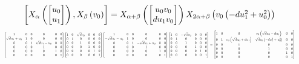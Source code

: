 \documentclass[11pt]{article}
\theoremstyle{definition}
\begin{document}
\[
\scaletoalign{\textwidth}{\left[ X_{\alpha}\left(\left[\begin{matrix}u_{0}\\u_{1}\end{matrix}\right]\right), X_{\beta}\left(v_{0}\right) \right] = X_{\alpha + \beta}\left(\left[\begin{matrix}u_{0} v_{0}\\d u_{1} v_{0}\end{matrix}\right]\right) X_{2\alpha + \beta}\left(v_{0} \left(- d u_{1}^{2} + u_{0}^{2}\right)\right)}
\]
\[
\scaletoalign{\textwidth}{{\left[\begin{matrix}1 & 0 & 0 & 0 & 0 & 0\\\sqrt{d} u_{1} + u_{0} & 1 & 0 & 0 & 0 & 0\\0 & 0 & 1 & \sqrt{d} u_{1} - u_{0} & 0 & 0\\0 & 0 & 0 & 1 & 0 & 0\\0 & 0 & 0 & 0 & 1 & 0\\0 & 0 & 0 & 0 & 0 & 1\end{matrix}\right]} {\left[\begin{matrix}1 & 0 & \sqrt{d} v_{0} & 0 & 0 & 0\\0 & 1 & 0 & 0 & 0 & 0\\0 & 0 & 1 & 0 & 0 & 0\\0 & 0 & 0 & 1 & 0 & 0\\0 & 0 & 0 & 0 & 1 & 0\\0 & 0 & 0 & 0 & 0 & 1\end{matrix}\right]} {\left[\begin{matrix}1 & 0 & 0 & 0 & 0 & 0\\- \sqrt{d} u_{1} - u_{0} & 1 & 0 & 0 & 0 & 0\\0 & 0 & 1 & - \sqrt{d} u_{1} + u_{0} & 0 & 0\\0 & 0 & 0 & 1 & 0 & 0\\0 & 0 & 0 & 0 & 1 & 0\\0 & 0 & 0 & 0 & 0 & 1\end{matrix}\right]} {\left[\begin{matrix}1 & 0 & - \sqrt{d} v_{0} & 0 & 0 & 0\\0 & 1 & 0 & 0 & 0 & 0\\0 & 0 & 1 & 0 & 0 & 0\\0 & 0 & 0 & 1 & 0 & 0\\0 & 0 & 0 & 0 & 1 & 0\\0 & 0 & 0 & 0 & 0 & 1\end{matrix}\right]} = {\left[\begin{matrix}1 & 0 & 0 & v_{0} \left(\sqrt{d} u_{0} - d u_{1}\right) & 0 & 0\\0 & 1 & v_{0} \left(\sqrt{d} u_{0} + d u_{1}\right) & \sqrt{d} v_{0} \left(- d u_{1}^{2} + u_{0}^{2}\right) & 0 & 0\\0 & 0 & 1 & 0 & 0 & 0\\0 & 0 & 0 & 1 & 0 & 0\\0 & 0 & 0 & 0 & 1 & 0\\0 & 0 & 0 & 0 & 0 & 1\end{matrix}\right]}}
\]
\end{document}
